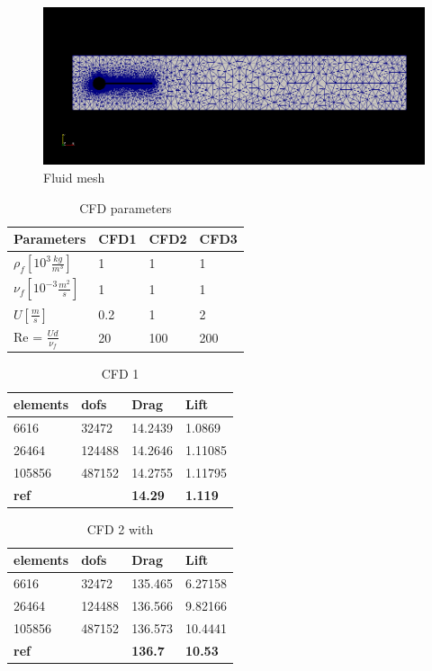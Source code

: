 \begin{figure}[H]
\caption{Fluid mesh}
\includegraphics[scale=0.5,trim={24mm 46mm 14mm 40mm},clip]{./Verification_Validation/Hron_Turek/fluid.png}
\end{figure}

\vspace{1cm}

\begin{table}[H]
\centering
\caption{CFD parameters}
\label{my-label}
\begin{tabular}{|l|l|l|l|}
\hline
Parameters & CFD1 & CFD2 & CFD3 \\ \hline
$\rho_f [10^3 \frac{kg}{m^3}]$ & 1 & 1 & 1 \\ \hline
$\nu_f [10^{-3} \frac{m^2}{s}]$ & 1 & 1 & 1 \\ \hline
$ U [\frac{m}{s}] $ & 0.2 & 1 & 2 \\ \hline
Re = $\frac{Ud}{\nu_f}$ & 20 & 100 & 200 \\ \hline
\end{tabular}
\end{table}

\begin{table}[H]
\centering
\caption{CFD 1}
\label{my-label}
\begin{tabular}{|l|l|l|l|}
\hline
\textbf{elements} & \textbf{dofs} & \textbf{Drag} & \textbf{Lift} \\ \hline
6616 & 32472 & 14.2439 & 1.0869 \\ \hline
26464 & 124488 & 14.2646 & 1.11085 \\ \hline
105856 & 487152 & 14.2755 & 1.11795 \\ \hline
\textbf{ref} & \textbf{} & \textbf{14.29} & \textbf{1.119} \\ \hline
\end{tabular}
\end{table}

\begin{table}[H]
\centering
\caption{CFD 2 with }
\label{my-label}
\begin{tabular}{|l|l|l|l|}
\hline
\textbf{elements} & \textbf{dofs} & \textbf{Drag} & \textbf{Lift} \\ \hline
6616 & 32472 & 135.465 & 6.27158 \\ \hline
26464 & 124488 & 136.566 & 9.82166 \\ \hline
105856 & 487152 & 136.573 & 10.4441 \\ \hline
\textbf{ref} & \textbf{} & \textbf{136.7} & \textbf{10.53} \\ \hline
\end{tabular}
\end{table}

